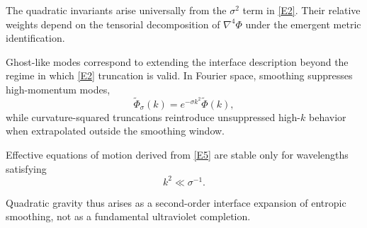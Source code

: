 \documentclass[11pt]{article}
\begin{document}
The quadratic invariants arise universally from the $\sigma^2$ term in \eqref{E2}. Their relative weights depend on the tensorial decomposition of $\nabla^4\Phi$ under the emergent metric identification.

Ghost-like modes correspond to extending the interface description beyond the regime in which \eqref{E2} truncation is valid. In Fourier space, smoothing suppresses high-momentum modes,
\begin{equation}
\widetilde{\Phi}_\sigma(k) = e^{-\sigma k^2}\widetilde{\Phi}(k),
\label{E6}
\end{equation}
while curvature-squared truncations reintroduce unsuppressed high-$k$ behavior when extrapolated outside the smoothing window.

Effective equations of motion derived from \eqref{E5} are stable only for wavelengths satisfying
\begin{equation}
k^2 \ll \sigma^{-1}.
\label{E7}
\end{equation}

Quadratic gravity thus arises as a second-order interface expansion of entropic smoothing, not as a fundamental ultraviolet completion.
\end{document}
